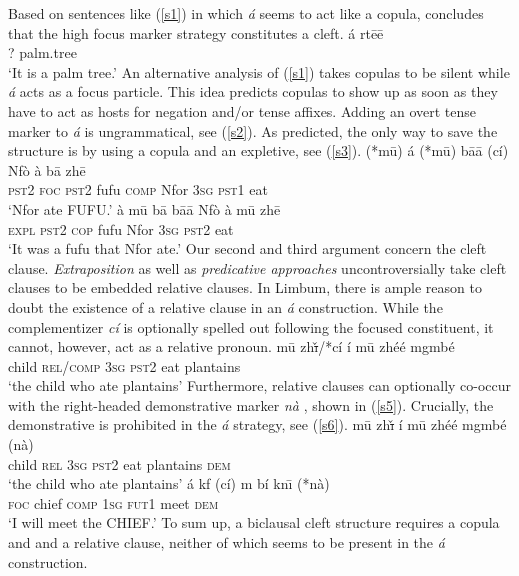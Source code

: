 \documentclass[output=paper,
modfonts
]{langscibook}
\begin{document}
Based on sentences like (\ref{s1}) in which \textit{\'a} seems to act like a copula, \citet[][301]{Fransen1995} concludes that the high focus marker strategy constitutes a cleft.
\ea \label{s1}
\gll \'a rt\=e\=e\\  
     ? palm.tree\\ 
\glt `It is a palm tree.'
\z
An alternative analysis of (\ref{s1}) takes copulas to be silent while \textit{\'a} acts as a focus particle. This idea predicts copulas to show up as soon as they have to act as hosts for negation and/or tense affixes. Adding an overt tense marker to \textit{\'a} is ungrammatical, see (\ref{s2}). As predicted, the only way to save the structure is by using a copula and an expletive, see (\ref{s3}).
\ea \label{s2}
\gll (*m\=u) \'{a} (*m\=u) b\=a\=a (c\'i) Nf\`{o} \`{a} b\=a zh\=e \\  
     \textsc{pst2} \textsc{foc} \textsc{pst2} fufu \textsc{comp} Nfor  \textsc{3sg} \textsc{pst1} eat \\ 
\glt `Nfor ate FUFU.'
\z
\ea \label{s3}
\gll à m\=u b\=a b\=a\=a Nf\`{o} \`{a} m\=u zh\=e \\  
     \textsc{expl} \textsc{pst2} \textsc{cop} fufu Nfor  \textsc{3sg} \textsc{pst2} eat \\ 
\glt `It was a fufu that Nfor ate.'
\z
Our second and third argument concern the cleft clause. \textit{Extraposition} \citep{Akmajian1970,Gundel1977,Percus1997} as well as \textit{predicative approaches} \citep{Svenious1998,Hedberg2000,Reeve2011} uncontroversially take cleft clauses to be embedded relative clauses. In Limbum, there is ample reason to doubt the existence of a relative clause in an {\em \'a} construction. While the complementizer \textit{c\'i} is optionally spelled out following the focused constituent, it cannot, however, act as a relative pronoun. 
\ea \label{s4}
\gll m\=u  {zh\sout{\v{\i}}}/*c\'i \'i m\=u zh\'e\'e mgmb\'e \\  
     child \textsc{rel/comp} \textsc{3sg} \textsc{pst2} eat plantains \\ 
\glt `the child who ate plantains'
\z
Furthermore, relative clauses can optionally co-occur with the right-headed demonstrative marker \textit{n\`a} \citep{Fransen1995,Mpoche1993}, shown in (\ref{s5}). Crucially, the demonstrative is prohibited in the \textit{\'a} strategy, see (\ref{s6}).
\ea \label{s5}
\gll m\=u zh\sout{\v{\i}} \'i m\=u zh\'e\'e mgmb\'e ({n\`a}) \\  
     child \textsc{rel} \textsc{3sg} \textsc{pst2} eat plantains \textsc{dem} \\ 
\glt `the child who ate plantains'
\z
\ea \label{s6}
\gll \'{a} {kf} (c\'{i}) m b\'{i} kn\={\i} (*{n\`a}) \\  
     \textsc{foc} {chief} \textsc{comp} \textsc{1sg} \textsc{fut1} meet \textsc{dem} \\ 
\glt `I will meet the CHIEF.'
\z
To sum up, a biclausal cleft structure requires a copula and and a relative clause, neither of which seems to be present in the {\em \'a} construction.
\end{document}
